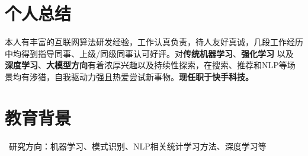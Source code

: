 \documentclass{resume}
\begin{document}


 
\section{\color{darkgray}个人总结}
本人有丰富的互联网算法研发经验，工作认真负责，待人友好真诚，几段工作经历中均得到指导同事、上级/同级同事认可好评。对\textbf{传统机器学习}、\textbf{强化学习} 以及 \textbf{深度学习}、\textbf{大模型方向}有着浓厚兴趣以及持续性探索，在搜索、推荐和NLP等场景均有涉猎，自我驱动力强且热爱尝试新事物。\textbf{现任职于快手科技。}

\section{\color{darkgray} 教育背景}
\ 研究方向：机器学习、模式识别、NLP相关统计学习方法、深度学习等


\end{document}
